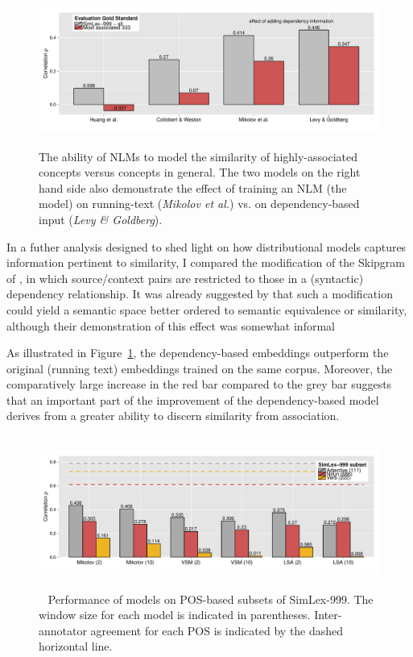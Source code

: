 \begin{figure}[]  \includegraphics[width = \textwidth,height=5cm]{Chapter_2/Figure_3A_CL}  \caption{\label{fig9} The ability of NLMs to model the similarity of highly-associated concepts versus concepts in general. The two models on the right hand side also demonstrate the effect of training an NLM (the \protect\cite{mikolov2013efficient} model) on running-text (\emph{Mikolov et al.}) vs. on dependency-based input (\emph{Levy \& Goldberg}).}\end{figure}

In a futher analysis designed to shed light on how distributional models captures information pertinent to similarity, I compared the modification of the Skipgram of \cite{2014dependency}, in which source/context pairs are restricted to those in a (syntactic) dependency relationship. It was already suggested by \cite{2014dependency} that such a modification could yield a semantic space better ordered to semantic equivalence or similarity, although their demonstration of this effect was somewhat informal 

As illustrated in Figure~\ref{fig9}, the dependency-based embeddings outperform the original (running text) embeddings trained on the same corpus. Moreover, the comparatively large increase in the red bar compared to the grey bar suggests that an important part of the improvement of the dependency-based model derives from a greater ability to discern similarity from association. 

\begin{figure}[]  \includegraphics[width = \textwidth,height=5cm]{Chapter_2/Figure_5_CL}  \caption{~\label{fig11} Performance of models on POS-based subsets of SimLex-999. The window size for each model is indicated in parentheses. Inter-annotator agreement for each POS is indicated by the dashed horizontal line.}\end{figure}

